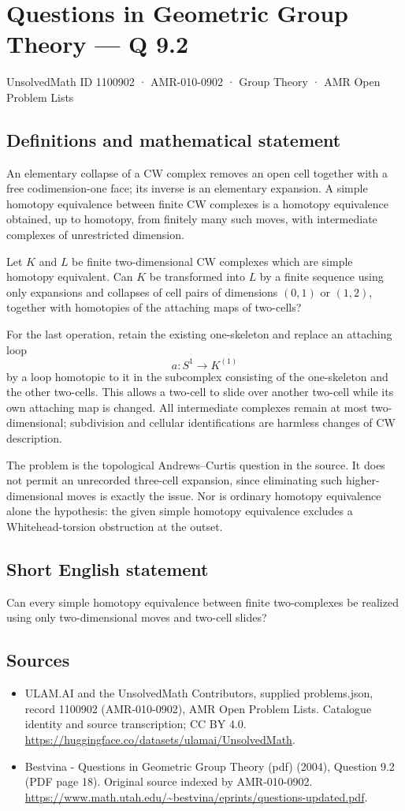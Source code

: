 \documentclass[11pt,a4paper]{article}
\begin{document}
\section*{Questions in Geometric Group Theory — Q 9.2}\label{1100902}
{\small UnsolvedMath ID 1100902 · AMR-010-0902 · Group Theory · AMR Open Problem Lists}
\subsection{Definitions and mathematical statement}
An elementary collapse of a CW complex removes an open cell together with a free codimension-one face; its inverse is an elementary expansion. A simple homotopy equivalence between finite CW complexes is a homotopy equivalence obtained, up to homotopy, from finitely many such moves, with intermediate complexes of unrestricted dimension.

Let $K$ and $L$ be finite two-dimensional CW complexes which are simple homotopy equivalent. Can $K$ be transformed into $L$ by a finite sequence using only expansions and collapses of cell pairs of dimensions $(0,1)$ or $(1,2)$, together with homotopies of the attaching maps of two-cells?

For the last operation, retain the existing one-skeleton and replace an attaching loop
\[
 a:S^1\longrightarrow K^{(1)}
\]
by a loop homotopic to it in the subcomplex consisting of the one-skeleton and the other two-cells. This allows a two-cell to slide over another two-cell while its own attaching map is changed. All intermediate complexes remain at most two-dimensional; subdivision and cellular identifications are harmless changes of CW description.

The problem is the topological Andrews--Curtis question in the source. It does not permit an unrecorded three-cell expansion, since eliminating such higher-dimensional moves is exactly the issue. Nor is ordinary homotopy equivalence alone the hypothesis: the given simple homotopy equivalence excludes a Whitehead-torsion obstruction at the outset.
\subsection{Short English statement}
Can every simple homotopy equivalence between finite two-complexes be realized using only two-dimensional moves and two-cell slides?
\subsection{Sources}
\begin{itemize}
\item[S1] ULAM.AI and the UnsolvedMath Contributors, supplied problems.json, record 1100902 (AMR-010-0902), AMR Open Problem Lists. Catalogue identity and source transcription; CC BY 4.0.
\url{https://huggingface.co/datasets/ulamai/UnsolvedMath}.
\item[S2] Bestvina - Questions in Geometric Group Theory (pdf) (2004), Question 9.2 (PDF page 18). Original source indexed by AMR-010-0902.
\url{https://www.math.utah.edu/~bestvina/eprints/questions-updated.pdf}.
\end{itemize}
\end{document}
